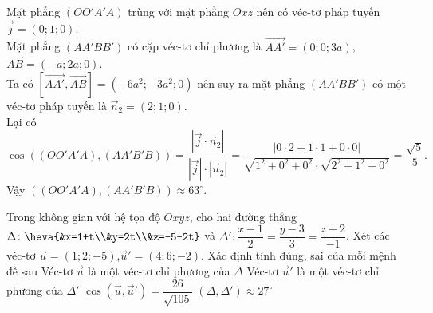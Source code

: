 \begin{ex}
{\begin{itemchoice}
\itemch
Mặt phẳng $(OO'A'A)$ trùng với mặt phẳng $Oxz$ nên có véc-tơ pháp tuyến\break $\overrightarrow{j}=(0;1;0)$.\\
Mặt phẳng $(AA'BB')$ có cặp véc-tơ chỉ phương là $\overrightarrow{AA'}=(0;0;3a)$, $\overrightarrow{AB}=(-a;2a;0)$.\\
Ta có $[\overrightarrow{AA'},\overrightarrow{AB}]=(-6a^2;-3a^2;0)$ nên suy ra mặt phẳng $(AA'BB')$ có một véc-tơ pháp tuyến là $\overrightarrow{n}_2=(2;1;0)$.\\
Lại có $$\cos((OO'A'A),(AA'B'B))=\dfrac{\left|\overrightarrow{j}\cdot\overrightarrow{n}_2 \right| }{\left|\overrightarrow{j}\right| \cdot \left| \overrightarrow{n}_2 \right|}=\dfrac{\left|0\cdot 2+1\cdot 1+0\cdot 0 \right| }{\sqrt{1^2+0^2+0^2}\cdot \sqrt{2^2+1^2+0^2}}=\dfrac{\sqrt{5}}{5}.$$
Vậy $((OO'A'A),(AA'B'B))\approx 63^\circ$.
		\end{itemchoice}
	}
\end{ex}


\begin{ex}%
	Trong không gian với hệ tọa độ $Oxyz$, cho hai đường thẳng $\Delta\colon \heva{&x=1+t\\&y=2t\\&z=-5-2t}$ và $\Delta'\colon \dfrac{x-1}{2}=\dfrac{y-3}{3}=\dfrac{z+2}{-1}$. Xét các véc-tơ $\overrightarrow{u}=(1;2;-5)$,$\overrightarrow{u}'=(4;6;-2)$.
	Xác định tính đúng, sai của mỗi mệnh đề sau
\choiceTF
{ Véc-tơ  $\overrightarrow{u}$ là một véc-tơ chỉ phương của $\Delta$ }
{\True Véc-tơ  $\overrightarrow{u}'$ là một véc-tơ chỉ phương của $\Delta'$}
{ $\cos(\overrightarrow{u},\overrightarrow{u}')=\dfrac{26}{\sqrt{105}}$}
{\True$(\Delta,\Delta')\approx 27^\circ$}
\end{ex}

